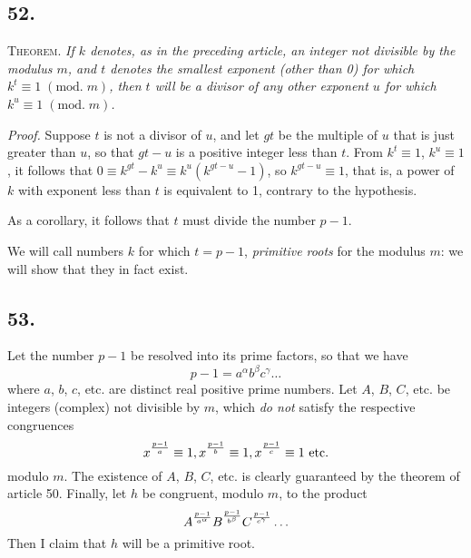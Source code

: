 \documentclass[twoside,12pt]{memoir}
\renewcommand{\pmod}[1]{\;(\textrm{mod.}\;#1)}
\let\oldfrac\frac
\def\frac#1#2{\mathchoice{\tfrac{#1}{#2}}{\oldfrac{#1}{#2}}{\genfrac{}{}{}{2}{#1}{#2\mathstrut}}{\genfrac{}{}{}{3}{#1}{#2\mathstrut}}}
\begin{document}
\subsection*{52.}

\textsc{Theorem.} \textit{If \(k\) denotes, as in the preceding article, an integer not divisible by the modulus \(m\), and \(t\) denotes the smallest exponent (other than 0) for which \(k^{t} \equiv 1\pmod{m}\), then \(t\) will be a divisor of any other exponent \(u\) for which \(k^{u} \equiv 1\pmod{m}\).}

\textit{Proof.} Suppose \(t\) is not a divisor of \(u\), and let \(g t\) be the multiple of \(u\) that is just greater than \(u\), so that \(g t-u\) is a positive integer less than \(t\). From \(k^{t} \equiv 1\), \(k^{u} \equiv 1\), it follows that \(0 \equiv k^{g t}-k^{u} \equiv k^{u}(k^{g t-u}-1)\), so \(k^{g t-u} \equiv 1\), that is, a power of \(k\) with exponent less than \(t\) is equivalent to 1, contrary to the hypothesis.

As a corollary, it follows that \(t\) must divide the number \(p-1\).

We will call numbers \(k\) for which \(t=p-1\), \textit{primitive roots} for the modulus \(m\): we will show that they in fact exist.
%

\subsection*{53.}

Let the number \(p-1\) be resolved into its prime factors, so that we have
\[p-1=a^{\alpha} b^{\beta} c^{\gamma} \ldots\]
where \(a\), \(b\), \(c\), etc{.} are distinct real positive prime numbers. Let \(A\), \(B\), \(C\), etc{.} be integers (complex) not divisible by \(m\), which \textit{do not} satisfy the respective congruences
\[x^{\frac{p-1}{a}} \equiv 1, x^{\frac{p-1}{b}} \equiv 1, x^{\frac{p-1}{c}} \equiv 1 \text{ etc{.}}\]
modulo \(m\).  The existence of \(A\), \(B\), \(C\), etc{.} is clearly guaranteed by the theorem of article 50. Finally, let \(h\) be congruent, modulo \(m\), to the product
\[A^{\frac{p-1}{a^{\alpha}}} B^{\frac{p-1}{b^{\beta}}} C^{\frac{p-1}{c^{\gamma}}} \ldots\]
Then I claim that \(h\) will be a primitive root.
\end{document}

